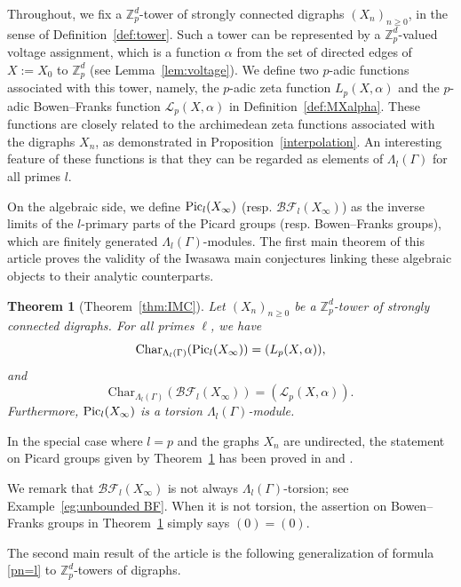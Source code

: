 \documentclass[11pt]{amsart}
\numberwithin{equation}{section}
\newtheorem{lthm}{Theorem} %
\theoremstyle{remark}
\newcommand{\?}{\stackrel{?}{=}}
\newcommand{\cL}{\mathcal{L}}
\newcommand{\Zp}{\mathbb{Z}_p}
\newcommand{\Char}{\mathrm{Char}}
\newcommand{\Pic}{\textup{Pic}}
\newcommand{\BF}{\mathcal{BF}}
\newcommand{\pic}{\textup{Pic}}
\begin{document}
Throughout, we fix a $\Zp^d$-tower of strongly connected digraphs $(X_n)_{n\ge0}$, in the sense of Definition~\ref{def:tower}. Such a tower can be represented by a $\Zp^d$-valued voltage assignment, which is a function $\alpha$ from the set of directed edges of $X:=X_0$ to $\Zp^d$ (see Lemma~\ref{lem:voltage}). We define two $p$-adic functions associated with this tower, namely, the $p$-adic zeta function $L_p(X,\alpha)$ and the $p$-adic Bowen--Franks function $\cL_p(X,\alpha)$ in Definition~\ref{def:MXalpha}. These functions are closely related to the archimedean zeta functions associated with the digraphs $X_n$, as demonstrated in Proposition~\ref{interpolation}. An interesting feature of these functions is that they can be regarded as elements of $\Lambda_l(\Gamma)$ for all primes $l$.

On the algebraic side, we define 
$\Pic_l(X_\infty)$ (resp. $\BF_l(X_\infty)$) as the inverse limits of the $l$-primary parts of the Picard groups (resp. Bowen--Franks groups), which are finitely generated $\Lambda_l(\Gamma)$-modules.
The first main theorem of this article proves the validity of the Iwasawa main conjectures linking these algebraic objects to their analytic counterparts.
\begin{lthm}[Theorem~\ref{thm:IMC}]\label{thmA}
    Let $(X_n)_{n\ge0}$ be a $\Zp^d$-tower of strongly connected digraphs. For all primes $\ell$, we have
   \[\Char_{\Lambda_l(\Gamma)}(\pic_l(X_\infty))=(L_p(X,\alpha)),\]
   and
   \[\Char_{\Lambda_l(\Gamma)}(\BF_l(X_\infty))=(\cL_p(X,\alpha)).\]
   Furthermore, ${\rm Pic}_{l}(X_{\infty})$ is a torsion $\Lambda_l(\Gamma)$-module. 
\end{lthm}
In the special case where $l=p$ and the graphs $X_n$ are undirected, the statement on Picard groups given by Theorem~\ref{thmA} has been proved in \cite[Theorem 6.1]{kataoka} and \cite[Theorem 5.2 and Remark 5.3]{KM1}.

We remark that $\BF_l(X_\infty)$ is not always $\Lambda_l(\Gamma)$-torsion; see Example~\ref{eg:unbounded BF}. When it is not torsion, the assertion on Bowen--Franks groups in Theorem~\ref{thmA} simply says $(0)=(0)$.


The second main result of the article is the following generalization of formula \eqref{pn=l} to $\Zp^d$-towers of digraphs.
\end{document}
